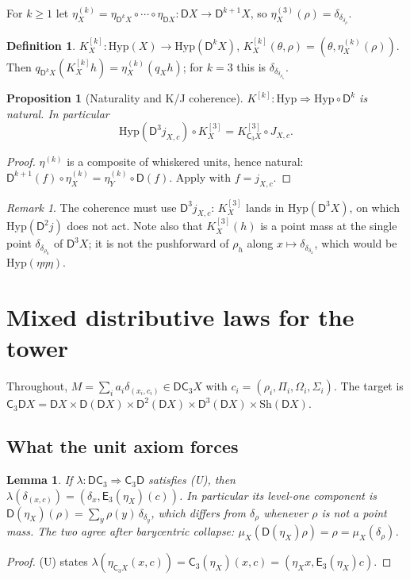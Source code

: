 \documentclass[11pt]{article}
\newtheorem{proposition}[theorem]{Proposition}
\newtheorem{lemma}[theorem]{Lemma}
\theoremstyle{definition}
\newtheorem{definition}[theorem]{Definition}
\theoremstyle{remark}
\newtheorem{remark}[theorem]{Remark}
\newcommand{\D}{\mathsf{D}}
\newcommand{\Hyp}{\mathrm{Hyp}}
\newcommand{\Sh}{\mathrm{Sh}}
\newcommand{\C}{\mathsf{C}}
\newcommand{\E}{\mathsf{E}}
\begin{document}
For $k\ge1$ let $\eta^{(k)}_X=\eta_{\D^kX}\circ\cdots\circ\eta_{\D X}\colon\D X\to\D^{k+1}X$, so
$\eta^{(3)}_X(\rho)=\delta_{\delta_{\delta_\rho}}$.

\begin{definition}
$K^{[k]}_X\colon\Hyp(X)\to\Hyp(\D^kX)$, $K^{[k]}_X(\theta,\rho)=(\theta,\eta^{(k)}_X(\rho))$. Then
$q_{\D^kX}(K^{[k]}_Xh)=\eta^{(k)}_X(q_Xh)$; for $k=3$ this is $\delta_{\delta_{\delta_{\rho_h}}}$.
\end{definition}

\begin{proposition}[Naturality and K/J coherence]\label{prop:K}
$K^{[k]}\colon\Hyp\Rightarrow\Hyp\circ\D^k$ is natural. In particular
\[
\Hyp(\D^3j_{X,c})\circ K^{[3]}_X=K^{[3]}_{\C_3X}\circ J_{X,c}.
\]
\end{proposition}
\begin{proof}
$\eta^{(k)}$ is a composite of whiskered units, hence natural:
$\D^{k+1}(f)\circ\eta^{(k)}_X=\eta^{(k)}_Y\circ\D(f)$. Apply with $f=j_{X,c}$.
\end{proof}

\begin{remark}
The coherence must use $\D^3j_{X,c}$: $K^{[3]}_X$ lands in $\Hyp(\D^3X)$, on which $\Hyp(\D^2j)$ does
not act. Note also that $K^{[3]}_X(h)$ is a point mass at the single point $\delta_{\delta_{\rho_h}}$ of
$\D^3X$; it is not the pushforward of $\rho_h$ along $x\mapsto\delta_{\delta_{\delta_x}}$, which would
be $\Hyp(\eta\eta\eta)$.
\end{remark}

\section{Mixed distributive laws for the tower}\label{sec:laws}

Throughout, $M=\sum_ia_i\delta_{(x_i,c_i)}\in\D\C_3X$ with $c_i=(\rho_i,\Pi_i,\Omega_i,\Sigma_i)$.
The target is $\C_3\D X=\D X\times\D(\D X)\times\D^2(\D X)\times\D^3(\D X)\times\Sh(\D X)$.

\subsection{What the unit axiom forces}

\begin{lemma}\label{lem:unit-forces}
If $\lambda\colon\D\C_3\Rightarrow\C_3\D$ satisfies (U), then
$\lambda(\delta_{(x,c)})=(\delta_x,\E_3(\eta_X)(c))$. In particular its level-one component is
$\D(\eta_X)(\rho)=\sum_y\rho(y)\,\delta_{\delta_y}$, which differs from $\delta_\rho$ whenever $\rho$ is
not a point mass. The two agree after barycentric collapse: $\mu_X(\D(\eta_X)\rho)=\rho=\mu_X(\delta_\rho)$.
\end{lemma}
\begin{proof}
(U) states $\lambda(\eta_{\C_3X}(x,c))=\C_3(\eta_X)(x,c)=(\eta_Xx,\E_3(\eta_X)c)$.
\end{proof}
\end{document}
